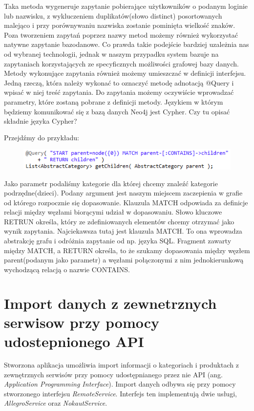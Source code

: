 Taka metoda wygeneruje zapytanie pobierające użytkowników o podanym loginie lub nazwisku, z wykluczeniem duplikatów(słowo distinct) posortowanych malejąco i przy porównywaniu nazwiska zostanie pominięta wielkość znaków. 
Poza tworzeniem zapytań poprzez nazwy metod możemy również wykorzystać natywne zapytanie bazodanowe. Co prawda takie podejście bardziej uzależnia nas od wybranej technologii, jednak w naszym przypadku system bazuje na zapytaniach korzystających ze specyficznych możliwości grafowej bazy danych. Metody wykonujące zapytania również możemy umieszczać w definicji interfejsu. Jedną rzeczą, która należy wykonać to oznaczyć metodę adnotacją @Query i wpisać w niej treść zapytania. Do zapytania możemy oczywiście wprowadzać parametry, które zostaną pobrane z definicji metody. Językiem w którym będziemy komunikować się z bazą danych Neo4j jest Cypher. 
Czy tu opisać składnie języka Cypher?

Przejdźmy do przykładu:

\begin{figure}[H]
	\centering
	\includegraphics{images/query.png}
\end{figure}

Jako parametr podaliśmy kategorie dla której chcemy znaleźć kategorie podrzędne(dzieci). Podany argument jest naszym miejscem zaczepienia w grafie od którego rozpocznie się dopasowanie. Klauzula MATCH odpowiada za definicje relacji między węzłami biorącymi udział w dopasowaniu. Słowo kluczowe RETRUN określa, który ze zdefiniowanych elementów chcemy otrzymać jako wynik zapytania. Najciekawsza tutaj jest klauzula MATCH. To ona wprowadza abstrakcję grafu i odróżnia zapytanie od np. języka SQL. Fragment zawarty między MATCH, a RETURN określa, to że szukamy dopasowania między węzłem parent(podanym jako parametr) a węzłami połączonymi z nim  jednokierunkową wychodzącą relacją o nazwie CONTAINS. 

\section{Import danych z zewnetrznych serwisow przy pomocy udostepnionego API}

Stworzona aplikacja umożliwia import informacji o kategoriach i produktach z zewnętrznych serwisów przy pomocy udostępnianego przez nie API (ang. \textit{Application Programming Interface}). Import danych odbywa się przy pomocy stworzonego interfejsu \textit{RemoteService}. Interfejs ten implementują dwie usługi, \textit{AllegroService} oraz \textit{NokautService}.

